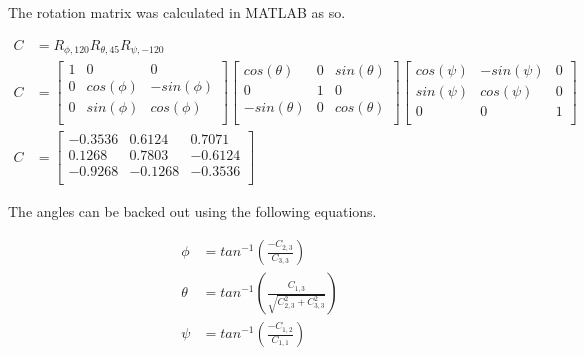\documentclass[12pt,letterpaper, onecolumn]{exam}
\begin{document}
\begin{questions}
    \solution
    The rotation matrix was calculated in MATLAB as so.

    \begin{equation*}
        \begin{split}
            C & = R_{\phi,120}R_{\theta,45}R_{\psi,-120} \\
            C & =
            \begin{bmatrix}
                1 & 0         & 0          \\
                0 & cos(\phi) & -sin(\phi) \\
                0 & sin(\phi) & cos(\phi)  \\
            \end{bmatrix}
            \begin{bmatrix}
                cos(\theta)  & 0 & sin(\theta) \\
                0            & 1 & 0           \\
                -sin(\theta) & 0 & cos(\theta) \\
            \end{bmatrix}
            \begin{bmatrix}
                cos(\psi) & -sin(\psi) & 0 \\
                sin(\psi) & cos(\psi)  & 0 \\
                0         & 0          & 1 \\
            \end{bmatrix} \\
            C & =
            \begin{bmatrix}
                -0.3536 & 0.6124  & 0.7071  \\
                0.1268  & 0.7803  & -0.6124 \\
                -0.9268 & -0.1268 & -0.3536 \\
            \end{bmatrix}
        \end{split}
    \end{equation*}

    The angles can be backed out using the following equations.

    \begin{equation*}
        \begin{split}
            \phi & = tan^{-1}\left(\frac{-C_{2,3}}{C_{3,3}}\right) \\
            \theta & = tan^{-1}\left(\frac{C_{1,3}}{\sqrt{C_{2,3}^2 + C_{3,3}^2}}\right) \\
            \psi & = tan^{-1}\left(\frac{-C_{1,2}}{C_{1,1}}\right) \\
        \end{split}
    \end{equation*}


\end{questions}
\end{document}
